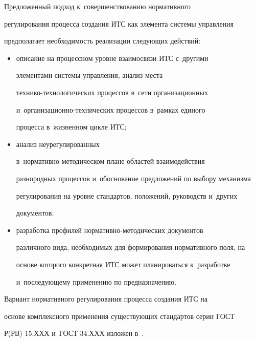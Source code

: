       


      Предложенный подход к~совершенствованию нормативного 


регулирования процесса создания ИТС как элемента системы управления 


предполагает необходимость реализации следующих действий:


      \begin{itemize}


      \item описание на процессном уровне взаимосвязи ИТС с~другими 


элементами системы управления, анализ места  


тех\-ни\-ко-тех\-но\-ло\-ги\-че\-ских процессов в~сети организационных 


и~ор\-га\-ни\-за\-ци\-он\-но-тех\-ни\-че\-ских процессов в~рамках единого 


процесса в~жизненном цикле ИТС;


      \item анализ неурегулированных  


в~нор\-ма\-тив\-но-ме\-то\-ди\-че\-ском плане областей взаимодействия 


разнородных процессов и~обоснование предложений по выбору механизма 


регулирования на уровне стандартов, положений, руководств и~других 


документов;


      \item разработка профилей нормативно-методических документов 


различного вида, необходимых для формирования нормативного поля, на 


основе которого конкретная ИТС может планироваться к~разработке 


и~последующему применению по предназначению.


      \end{itemize}


      


      Вариант нормативного регулирования процесса создания ИТС на 


основе комплексного применения существующих стандартов серии ГОСТ 


Р(РВ) 15.ХХХ и~ГОСТ 34.ХХХ изложен в~\cite{12-zac}.





\vspace*{-3pt}


